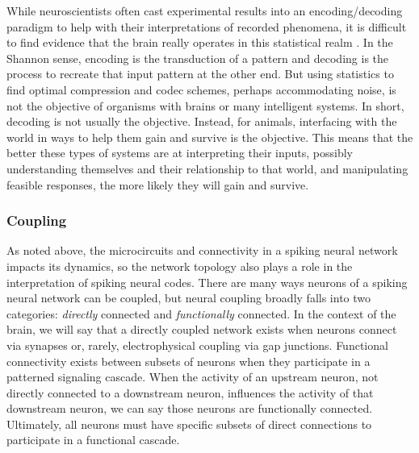 While neuroscientists often cast experimental results into an encoding/decoding paradigm to help with their interpretations of recorded phenomena, it is difficult to find evidence that the brain really operates in this statistical realm \cite{bretteCodingRelevantMetaphor2019}.
In the Shannon sense, encoding is the transduction of a pattern and decoding is the process to recreate that input pattern at the other end.
But using statistics to find optimal compression and codec schemes, perhaps accommodating noise, is not the objective of organisms with brains or many intelligent systems.
In short, decoding is not usually the objective.
Instead, for animals, interfacing with the world in ways to help them gain and survive is the objective.
This means that the better these types of systems are at interpreting their inputs, possibly understanding themselves and their relationship to that world, and manipulating feasible responses, the more likely they will gain and survive.

\subsubsection{Coupling}

As noted above, the microcircuits and connectivity in a spiking neural network impacts its dynamics, so the network topology also plays a role in the interpretation of spiking neural codes.
There are many ways neurons of a spiking neural network can be coupled, but neural coupling broadly falls into two categories: \emph{directly} connected and \emph{functionally} connected.
In the context of the brain, we will say that a directly coupled network exists when neurons connect via synapses or, rarely, electrophysical coupling via gap junctions.
Functional connectivity exists between subsets of neurons when they participate in a patterned signaling cascade.
When the activity of an upstream neuron, not directly connected to a downstream neuron, influences the activity of that downstream neuron, we can say those neurons are functionally connected. 
Ultimately, all neurons must have specific subsets of direct connections to participate in a functional cascade.



